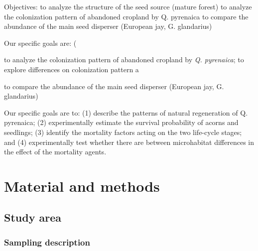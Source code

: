 \documentclass[
]{article}
\begin{document}
Objectives: to analyze the structure of the seed source (mature forest)
to analyze the colonization pattern of abandoned cropland by Q.
pyrenaica to compare the abundance of the main seed disperser (European
jay, G. glandarius)

Our specific goals are: (

to analyze the colonization pattern of abandoned cropland by \emph{Q.
pyrenaica}; to explore differences on colonization pattern a

to compare the abundance of the main seed disperser (European jay, G.
glandarius)

Our specific goals are to: (1) describe the patterns of natural
regeneration of Q. pyrenaica; (2) experimentally estimate the survival
probability of acorns and seedlings; (3) identify the mortality factors
acting on the two life-cycle stages; and (4) experimentally test whether
there are between microhabitat differences in the effect of the
mortality agents.

\hypertarget{material-and-methods}{%
\section{Material and methods}\label{material-and-methods}}

\hypertarget{study-area}{%
\subsection{Study area}\label{study-area}}

\hypertarget{sampling-description}{%
\subsubsection{Sampling description}\label{sampling-description}}
\end{document}
